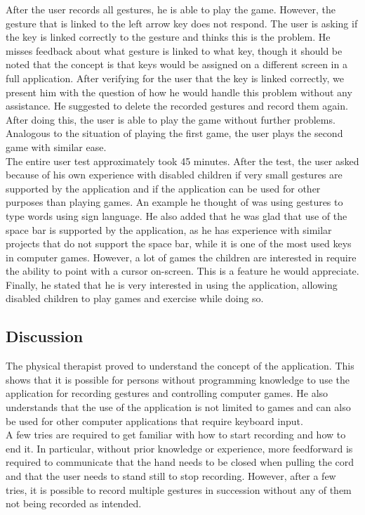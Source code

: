 After the user records all gestures, he is able to play the game. However, the gesture that is linked to the left arrow key does not respond. The user is asking if the key is linked correctly to the gesture and thinks this is the problem. He misses feedback about what gesture is linked to what key, though it should be noted that the concept is that keys would be assigned on a different screen in a full application. After verifying for the user that the key is linked correctly, we present him with the question of how he would handle this problem without any assistance. He suggested to delete the recorded gestures and record them again. After doing this, the user is able to play the game without further problems. Analogous to the situation of playing the first game, the user plays the second game with similar ease.\\

The entire user test approximately took 45 minutes. After the test, the user asked because of his own experience with disabled children if very small gestures are supported by the application and if the application can be used for other purposes than playing games. An example he thought of was using gestures to type words using sign language. He also added that he was glad that use of the space bar is supported by the application, as he has experience with similar projects that do not support the space bar, while it is one of the most used keys in computer games. However, a lot of games the children are interested in require the ability to point with a cursor on-screen. This is a feature he would appreciate. Finally, he stated that he is very interested in using the application, allowing disabled children to play games and exercise while doing so.


\subsection{Discussion}

The physical therapist proved to understand the concept of the application. This shows that it is possible for persons without programming knowledge to use the application for recording gestures and controlling computer games. He also understands that the use of the application is not limited to games and can also be used for other computer applications that require keyboard input.\\

A few tries are required to get familiar with how to start recording and how to end it. In particular, without prior knowledge or experience, more feedforward is required to communicate that the hand needs to be closed when pulling the cord and that the user needs to stand still to stop recording. However, after a few tries, it is possible to record multiple gestures in succession without any of them not being recorded as intended.\\

